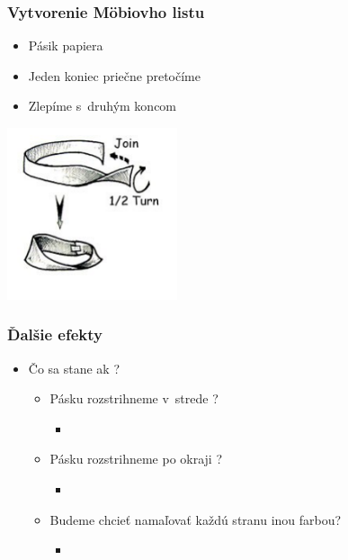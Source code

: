 \documentclass{beamer}
\begin{document}
\begin{frame}
\frametitle{Vytvorenie Möbiovho listu}
\centering
\begin{itemize}
\item Pásik papiera
\item Jeden koniec priečne pretočíme 
\item Zlepíme s~druhým koncom  
\end{itemize}
\includegraphics[width=5cm]{priprava.png}
\end{frame} 

\begin{frame}
\frametitle{Ďalšie efekty}
\centering
\begin{itemize}
\item Čo sa stane ak ? 
\bigskip
\begin{itemize}
\item Pásku rozstrihneme v~strede ? 
\begin{itemize}
\item[]
\medskip
\end{itemize}
\item Pásku rozstrihneme po okraji ? 
\begin{itemize}
\item[]
\medskip
\end{itemize}
\item Budeme chcieť namaľovať každú stranu inou farbou? 
\begin{itemize}
\item[]
\medskip
\end{itemize}
\end{itemize}
\end{itemize}
\end{frame} 
\end{document}
